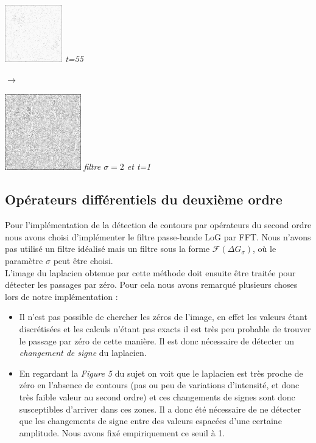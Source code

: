 \documentclass[a4,12pt]{article}
\begin{document}
\begin{minipage}[c]{0.10\linewidth}
	\begin{center}
		\includegraphics[width = 25mm]{./img/p2test_grad_fin_globules10_t55.jpg}
		\textit{t=55}
	\end{center}
\end{minipage}
\hspace{2cm}
$\longrightarrow$
\hspace{1cm}
\begin{minipage}[c]{0.10\linewidth}
	\begin{center}
		\includegraphics[width = 33mm]{./img/globulesbb10_filtre2_fin1.jpg}
		\textit{filtre $\sigma=2$ et t=1}
	\end{center}
\end{minipage}



\subsection{Opérateurs différentiels du deuxième ordre}
Pour l'implémentation de la détection de contours par opérateurs du second ordre nous avons choisi d'implémenter le filtre passe-bande LoG par FFT. Nous n'avons pas utilisé un filtre idéalisé mais un filtre sous la forme $\mathcal{F}(\Delta G_{\sigma})$, où le paramètre $\sigma$ peut être choisi.\\


L'image du laplacien obtenue par cette méthode doit ensuite être traitée pour détecter les passages par zéro. Pour cela nous avons remarqué plusieurs choses lors de notre implémentation :
\begin{itemize}
	\item Il n'est pas possible de chercher les zéros de l'image, en effet les valeurs étant discrétisées et les calculs n'étant pas exacts il est très peu probable de trouver le passage par zéro de cette manière. Il est donc nécessaire de détecter un \textit{changement de signe} du laplacien.
	\item En regardant la \textit{Figure 5} du sujet on voit que le laplacien est très proche de zéro en l'absence de contours (pas ou peu de variations d'intensité, et donc très faible valeur au second ordre) et ces changements de signes sont donc susceptibles d'arriver dans ces zones. Il a donc été nécessaire de ne détecter que les changements de signe entre des valeurs espacées d'une certaine amplitude. Nous avons fixé empiriquement ce seuil à 1.\\
\end{itemize}
\end{document}
